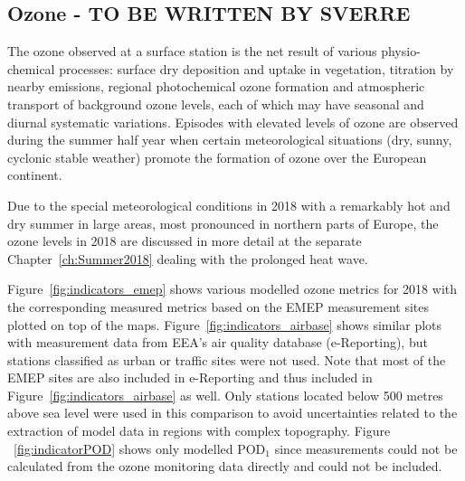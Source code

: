 \subsection{Ozone - TO BE WRITTEN BY SVERRE}
\label{O3MAX}

The ozone observed at a surface station is the net result of various physio-chemical processes: surface dry deposition and uptake in vegetation, titration by nearby \nox emissions, regional photochemical ozone formation and atmospheric transport of background ozone levels, each of which may have seasonal and diurnal systematic variations. Episodes with elevated levels of ozone are observed during the summer half year when certain meteorological situations (dry, sunny, cyclonic stable weather) promote the formation of ozone over the European continent. 

Due to the special meteorological conditions in 2018 with a remarkably hot and dry summer in large areas, most pronounced in northern parts of Europe, the ozone levels in 2018 are discussed in more detail at the separate Chapter~\ref{ch:Summer2018} dealing with the prolonged heat wave.

Figure~\ref{fig:indicators_emep} shows various modelled ozone metrics for 2018 with the corresponding measured metrics based on the EMEP measurement sites plotted on top of the maps. Figure~\ref{fig:indicators_airbase} shows similar plots with measurement data from EEA's air quality database (e-Reporting), but stations classified as urban or traffic sites were not used. Note that most of the EMEP sites are also included in e-Reporting and thus included in Figure~\ref{fig:indicators_airbase} as well. Only stations located below 500 metres above sea level were used in this comparison to avoid uncertainties related to the extraction of model data in regions with complex topography. Figure
~\ref{fig:indicatorPOD} shows only modelled POD$_1$ since measurements could not be calculated from the ozone monitoring data directly and could not be included.

